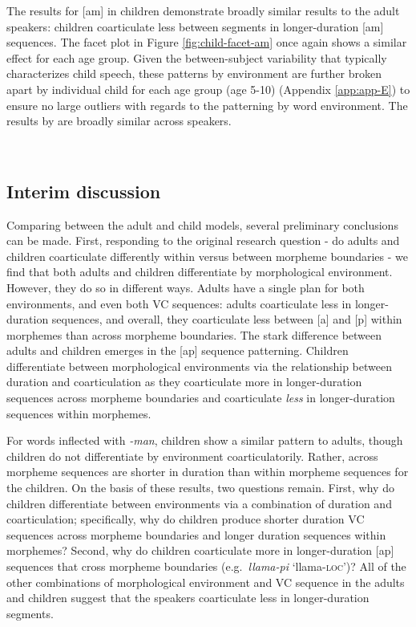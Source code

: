 \documentclass[a4paper,man,floatsintext,natbib,donotrepeattitle, apacite]{apa6}
\begin{document}
The results for {[}am{]} in children demonstrate broadly similar results to the adult speakers: children coarticulate less between segments in longer-duration {[}am{]} sequences. The facet plot in Figure \ref{fig:child-facet-am} once again shows a similar effect for each age group. Given the between-subject variability that typically characterizes child speech, these patterns by environment are further broken apart by individual child for each age group (age 5-10) (Appendix \ref{app:app-E}) to ensure no large outliers with regards to the patterning by word environment. The results by are broadly similar across speakers.

~
~

{%
\subsection{Interim discussion}\label{interim-discussion}}

Comparing between the adult and child models, several preliminary conclusions can be made. First, responding to the original research question - do adults and children coarticulate differently within versus between morpheme boundaries - we find that both adults and children differentiate by morphological environment. However, they do so in different ways. Adults have a single plan for both environments, and even both VC sequences: adults coarticulate less in longer-duration sequences, and overall, they coarticulate less between {[}a{]} and {[}p{]} within morphemes than across morpheme boundaries. The stark difference between adults and children emerges in the {[}ap{]} sequence patterning. Children differentiate between morphological environments via the relationship between duration and coarticulation as they coarticulate more in longer-duration sequences across morpheme boundaries and coarticulate \emph{less} in longer-duration sequences within morphemes.

For words inflected with \emph{-man}, children show a similar pattern to adults, though children do not differentiate by environment coarticulatorily. Rather, across morpheme sequences are shorter in duration than within morpheme sequences for the children. On the basis of these results, two questions remain. First, why do children differentiate between environments via a combination of duration and coarticulation; specifically, why do children produce shorter duration VC sequences across morpheme boundaries and longer duration sequences within morphemes? Second, why do children coarticulate more in longer-duration {[}ap{]} sequences that cross morpheme boundaries (e.g.~\emph{llama-pi} `llama-\textsc{loc}')? All of the other combinations of morphological environment and VC sequence in the adults and children suggest that the speakers coarticulate less in longer-duration segments.
\end{document}
